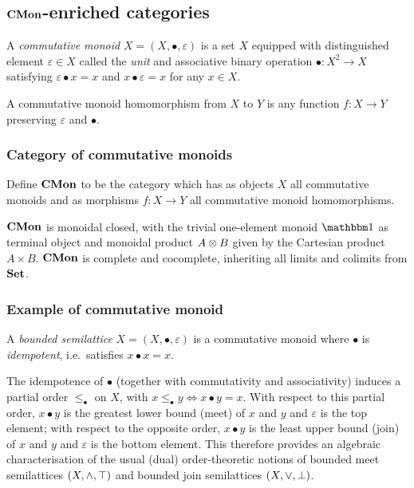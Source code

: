 \subsection{$\mathbf{CMon}$-enriched categories}
\label{sec:cmon-enriched}

\begin{definition}
A \emph{commutative monoid} $X = (X, \bullet, \varepsilon)$ is a set $X$ equipped with distinguished element
$\varepsilon \in X$ called the \emph{unit} and associative binary operation $\bullet: X^2 \to X$ satisfying
$\varepsilon \bullet x = x$ and $x \bullet \varepsilon = x$ for any $x \in X$.
\end{definition}

A commutative monoid homomorphism from $X$ to $Y$ is any function $f: X \to Y$ preserving $\varepsilon$ and
$\bullet$.

\subsubsection{Category of commutative monoids}

\begin{definition}
Define $\mathbf{CMon}$ to be the category which has as objects $X$ all commutative monoids and as morphisms $f: X \to
Y$ all commutative monoid homomorphisms.
\end{definition}

$\mathbf{CMon}$ is monoidal closed, with the trivial one-element monoid $\One$ as terminal object and monoidal product
$A \otimes B$ given by the Cartesian product $A \times B$. $\mathbf{CMon}$ is complete and cocomplete, inheriting all
limits and colimits from $\mathbf{Set}$.

\subsubsection{Example of commutative monoid}

\begin{definition}
\label{def:cmon-enriched:bounded-semilattice}
A \emph{bounded semilattice} $X = (X, \bullet, \varepsilon)$ is a commutative monoid where $\bullet$ is
\emph{idempotent}, i.e.~satisfies $x \bullet x = x$.
\end{definition}

\noindent The idempotence of $\bullet$ (together with commutativity and associativity) induces a partial order
$\le_\bullet$ on $X$, with $x \le_{\bullet} y \iff x \bullet y = x$. With respect to this partial order, $x
\bullet y$ is the greatest lower bound (meet) of $x$ and $y$ and $\varepsilon$ is the top element; with
respect to the opposite order, $x \bullet y$ is the least upper bound (join) of $x$ and $y$ and $\varepsilon$
is the bottom element. This therefore provides an algebraic characterisation of the usual (dual)
order-theoretic notions of bounded meet semilattices $(X, \wedge, \top)$ and bounded join semilattices $(X,
\vee, \bot)$.

